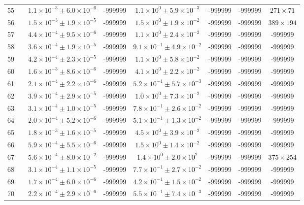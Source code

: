 \begin{table}
\begin{tabular}{cccccccc}
55 &  & $1.1\times10^{-3}\pm 6.0\times10^{-6}$ & -999999 & $1.1\times10^{0}\pm 5.9\times10^{-3}$ & -999999 & -999999 & $271\times 71$ \\
56 &  & $1.5\times10^{-3}\pm 1.9\times10^{-5}$ & -999999 & $1.5\times10^{0}\pm 1.9\times10^{-2}$ & -999999 & -999999 & $389\times 194$ \\
57 &  & $4.4\times10^{-4}\pm 9.5\times10^{-6}$ & -999999 & $1.1\times10^{0}\pm 2.4\times10^{-2}$ & -999999 & -999999 & -999999 \\
58 &  & $3.6\times10^{-4}\pm 1.9\times10^{-5}$ & -999999 & $9.1\times10^{-1}\pm 4.9\times10^{-2}$ & -999999 & -999999 & -999999 \\
59 &  & $4.2\times10^{-4}\pm 2.3\times10^{-5}$ & -999999 & $1.1\times10^{0}\pm 5.8\times10^{-2}$ & -999999 & -999999 & -999999 \\
60 &  & $1.6\times10^{-3}\pm 8.6\times10^{-6}$ & -999999 & $4.1\times10^{0}\pm 2.2\times10^{-2}$ & -999999 & -999999 & -999999 \\
61 &  & $2.1\times10^{-4}\pm 2.2\times10^{-6}$ & -999999 & $5.2\times10^{-1}\pm 5.7\times10^{-3}$ & -999999 & -999999 & -999999 \\
62 &  & $3.9\times10^{-4}\pm 2.9\times10^{-5}$ & -999999 & $1.0\times10^{0}\pm 7.3\times10^{-2}$ & -999999 & -999999 & -999999 \\
63 &  & $3.1\times10^{-4}\pm 1.0\times10^{-5}$ & -999999 & $7.8\times10^{-1}\pm 2.6\times10^{-2}$ & -999999 & -999999 & -999999 \\
64 &  & $2.0\times10^{-4}\pm 5.2\times10^{-6}$ & -999999 & $5.1\times10^{-1}\pm 1.3\times10^{-2}$ & -999999 & -999999 & -999999 \\
65 &  & $1.8\times10^{-3}\pm 1.6\times10^{-5}$ & -999999 & $4.5\times10^{0}\pm 3.9\times10^{-2}$ & -999999 & -999999 & -999999 \\
66 &  & $5.9\times10^{-4}\pm 5.5\times10^{-6}$ & -999999 & $1.5\times10^{0}\pm 1.4\times10^{-2}$ & -999999 & -999999 & -999999 \\
67 &  & $5.6\times10^{-4}\pm 8.0\times10^{-2}$ & -999999 & $1.4\times10^{0}\pm 2.0\times10^{2}$ & -999999 & -999999 & $375\times 254$ \\
68 &  & $3.1\times10^{-4}\pm 1.1\times10^{-5}$ & -999999 & $7.7\times10^{-1}\pm 2.7\times10^{-2}$ & -999999 & -999999 & -999999 \\
69 &  & $1.7\times10^{-4}\pm 6.0\times10^{-6}$ & -999999 & $4.2\times10^{-1}\pm 1.5\times10^{-2}$ & -999999 & -999999 & -999999 \\
70 &  & $2.2\times10^{-4}\pm 2.9\times10^{-6}$ & -999999 & $5.5\times10^{-1}\pm 7.4\times10^{-3}$ & -999999 & -999999 & -999999 \\

\end{tabular}
\end{table}
